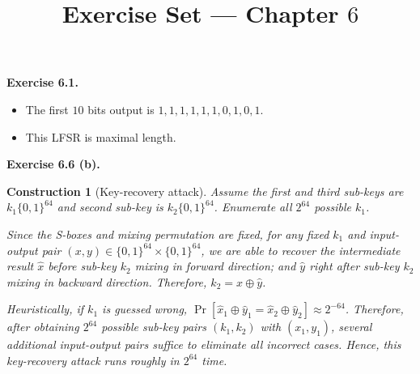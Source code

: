 \documentclass[a4paper]{article}
\title{Exercise Set --- Chapter $6$}
\date{}
\newtheorem{construction}{Construction}
\newenvironment{exercise}[1]{
	\par
	\noindent\textbf{Exercise #1.}\quad
}{
	\par
	\bigskip
}
\newcommand{\sbra}[1]{\left[ #1 \right]}
\newcommand{\bin}{\{0,1\}}
\begin{document}
\maketitle

\begin{exercise}{6.1}
\begin{itemize}
    \item[(a)] The first $10$ bits output is $1,1,1,1,1,1,0,1,0,1$.
    \item[(b)] This LFSR is maximal length.
\end{itemize}
\end{exercise}

\begin{exercise}{6.6 (b)}
\begin{construction}[Key-recovery attack]
    Assume the first and third sub-keys are $k_1\bin^{64}$ and second sub-key is $k_2\bin^{64}$.
    Enumerate all $2^{64}$ possible $k_1$. 

    Since the S-boxes and mixing permutation are fixed,
    for any fixed $k_1$ and input-output pair $(x,y)\in\bin^{64}\times\bin^{64}$, 
    we are able to recover the intermediate result $\hat x$ before sub-key $k_2$ mixing in forward direction;
    and $\hat y$ right after sub-key $k_2$ mixing in backward direction. Therefore, $k_2=\hat x\oplus\hat y$.

    Heuristically, if $k_1$ is guessed wrong, $\Pr\sbra{\hat x_1\oplus\hat y_1=\hat x_2\oplus\hat y_2}\approx 2^{-64}$.
    Therefore, after obtaining $2^{64}$ possible sub-key pairs $(k_1,k_2)$ with $(x_1,y_1)$, several additional 
    input-output pairs suffice to eliminate all incorrect cases. Hence, this key-recovery attack runs roughly in $2^{64}$ time.
\end{construction}
\end{exercise}
\end{document}
